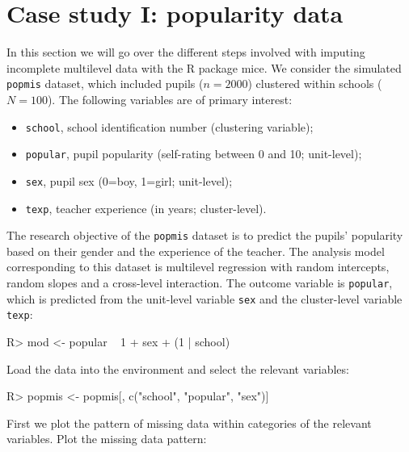 \documentclass[
]{jss}
\providecommand{\tightlist}{%
  \setlength{\itemsep}{0pt}\setlength{\parskip}{0pt}}
\begin{document}
\hypertarget{case-study-i-popularity-data}{%
\section{Case study I: popularity
data}\label{case-study-i-popularity-data}}

In this section we will go over the different steps involved with
imputing incomplete multilevel data with the R package mice. We consider
the simulated \texttt{popmis} dataset, which included pupils
(\(n = 2000\)) clustered within schools (\(N = 100\)). The following
variables are of primary interest:

\begin{itemize}
\tightlist
\item
  \texttt{school}, school identification number (clustering variable);
\item
  \texttt{popular}, pupil popularity (self-rating between 0 and 10;
  unit-level);
\item
  \texttt{sex}, pupil sex (0=boy, 1=girl; unit-level);
\item
  \texttt{texp}, teacher experience (in years; cluster-level).
\end{itemize}

The research objective of the \texttt{popmis} dataset is to predict the
pupils' popularity based on their gender and the experience of the
teacher. The analysis model corresponding to this dataset is multilevel
regression with random intercepts, random slopes and a cross-level
interaction. The outcome variable is \texttt{popular}, which is
predicted from the unit-level variable \texttt{sex} and the
cluster-level variable \texttt{texp}:

\begin{CodeChunk}
\begin{CodeInput}
R> mod <- popular ~ 1 + sex + (1 | school)
\end{CodeInput}
\end{CodeChunk}

Load the data into the environment and select the relevant variables:

\begin{CodeChunk}
\begin{CodeInput}
R> popmis <- popmis[, c("school", "popular", "sex")] 
\end{CodeInput}
\end{CodeChunk}

First we plot the pattern of missing data within categories of the
relevant variables. Plot the missing data pattern:
\end{document}

